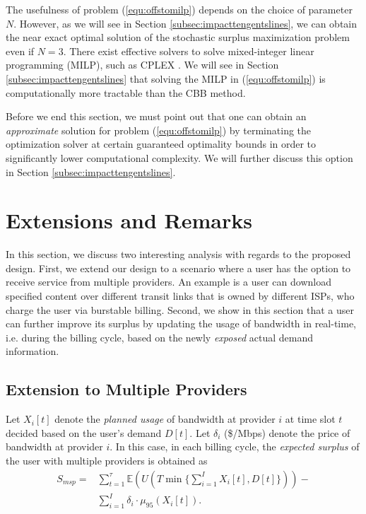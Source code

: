 \documentclass[10pt,journal,compsoc]{IEEEtran}
\begin{document}
\vspace{0.2cm}

 The usefulness of problem (\ref{equ:offstomilp}) depends on the choice of parameter $N$. However, as we will see in Section \ref{subsec:impacttengentslines}, we can obtain the near exact optimal solution of the stochastic surplus maximization problem even if $N = 3$. There exist effective solvers to solve mixed-integer linear programming (MILP), such as CPLEX \cite{CPLEX}. We will see in Section \ref{subsec:impacttengentslines} that solving the MILP in (\ref{equ:offstomilp}) is computationally more tractable than the CBB method.

Before we end this section, we must point out that one can obtain an \emph{approximate} solution for problem (\ref{equ:offstomilp}) by terminating the optimization solver at certain guaranteed optimality bounds in order to significantly lower computational complexity. We will further discuss this option in Section \ref{subsec:impacttengentslines}. 

\vspace{0.1cm}


\section{Extensions and Remarks}
In this section, we discuss two interesting analysis with regards to the proposed design. 
First,  we extend our design to a scenario where a user has the option to receive service from multiple providers. An example is a user can download specified content over different transit links that is owned by different ISPs, who charge the user via burstable billing. 
Second, we show in this section that  a user can further improve its surplus by updating the usage of bandwidth in real-time, i.e. during the billing cycle, based on the newly \emph{exposed} actual demand information.

\subsection{Extension to Multiple Providers}
Let $X_{i}[t]$ denote the \emph{planned usage} of bandwidth at provider $i$ at time slot $t$ decided based on the user's demand $D[t]$. 
Let $\delta_i$ (\$/Mbps) denote the price of bandwidth at provider $i$. In this case, in each billing cycle, the  \emph{expected surplus} of the user with multiple providers is obtained as
\begin{equation}\label{equ:surplusmsp}
\begin{aligned}
S_{msp}=&\sum_{t=1}^{\tau} {\mathbb{E}\left(U(T\min\{\sum_{i=1}^{I} X_{i}[t],D[t]\})\right)}-\\
&\sum_{i=1}^{I} \delta_{i} \cdot \mu_{95}(X_{i}[t]).
\end{aligned}
\end{equation}
\end{document}
